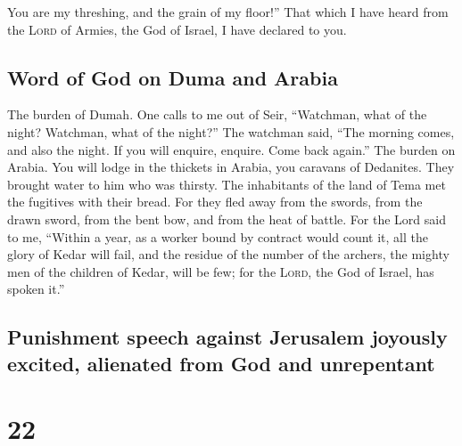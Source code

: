  You are my threshing, and the grain of my floor!'' That
which I have heard from the \textsc{Lord} of Armies, the God of Israel,
I have declared to you.

\hypertarget{word-of-god-on-duma-and-arabia}{%
\subsection{Word of God on Duma and
Arabia}\label{word-of-god-on-duma-and-arabia}}

 The burden of Dumah. One calls to me out of Seir,
``Watchman, what of the night? Watchman, what of the night?''
 The watchman said, ``The morning comes, and also the
night. If you will enquire, enquire. Come back again.'' 
The burden on Arabia. You will lodge in the thickets in Arabia, you
caravans of Dedanites.  They brought water to him who was
thirsty. The inhabitants of the land of Tema met the fugitives with
their bread.  For they fled away from the swords, from
the drawn sword, from the bent bow, and from the heat of battle.
 For the Lord said to me, ``Within a year, as a worker
bound by contract would count it, all the glory of Kedar will fail,
 and the residue of the number of the archers, the mighty
men of the children of Kedar, will be few; for the \textsc{Lord}, the
God of Israel, has spoken it.''

\hypertarget{punishment-speech-against-jerusalem-joyously-excited-alienated-from-god-and-unrepentant}{%
\subsection{Punishment speech against Jerusalem joyously excited,
alienated from God and
unrepentant}\label{punishment-speech-against-jerusalem-joyously-excited-alienated-from-god-and-unrepentant}}

\hypertarget{section-21}{%
\section{22}\label{section-21}}

